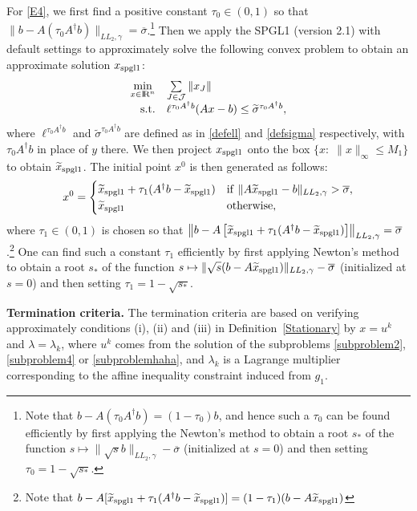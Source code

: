 \documentclass[10pt]{article}
\numberwithin{equation}{section}
\def\R{{\rm I\!R}}
\begin{document}
For \eqref{E4}, we first find a positive constant $\tau_0\in(0, 1)$ so that $\|b - A(\tau_0 A^\dagger b)\|_{LL_2,\gamma} = \overline\sigma$.\footnote{Note that $b - A(\tau_0 A^\dagger b) = (1 - \tau_0)b$, and hence such a $\tau_0$ can be found efficiently by first applying the Newton's method to obtain a root $s_*$ of the function $s\mapsto \|\sqrt{s}b\|_{LL_2,\gamma} - \overline\sigma$ (initialized at $s = 0$) and then setting $\tau_0 = 1 - \sqrt{s_*}$.}
Then we apply the SPGL1 \cite{BeFr09} (version 2.1) with default settings to approximately solve the following convex problem to obtain an approximate solution $x_{\rm spgl1}$:
\begin{equation}\label{SPGL1nonconvexL1}
\begin{array}{rl}
  \min\limits_{x\in \R^n} & \sum\limits_{J\in\mathcal{J}}\|x_J\| \\
  {\rm s.t.} & \ell^{\tau_0A^\dagger b}(Ax - b)\le \widetilde\sigma^{\tau_0A^\dagger b},
\end{array}
\end{equation}
where $\ell^{\tau_0A^\dagger b}$ and $\widetilde\sigma^{\tau_0A^\dagger b}$ are defined as in \eqref{defell} and \eqref{defsigma} respectively, with $\tau_0A^\dagger b$ in place of $y$ there. We then project $x_{\rm spgl1}$ onto the box $\{x:\; \|x\|_\infty\le M_1\}$ to obtain $\widetilde x_{\rm spgl1}$. The initial point $x^0$ is then generated as follows:
\begin{equation}\label{initial2}
x^0 = \begin{cases}
  \widetilde x_{\rm spgl1} + \tau_1(A^\dagger b - \widetilde x_{\rm spgl1}) & {\rm if}\ \|A\widetilde x_{\rm spgl1} - b\|_{LL_2,\gamma} > \overline\sigma,\\
  \widetilde x_{\rm spgl1} & {\rm otherwise},
\end{cases}
\end{equation}
where $\tau_1\in (0, 1)$ is chosen so that $\left\|b - A\left[\widetilde x_{\rm spgl1} + \tau_1(A^\dagger b - \widetilde x_{\rm spgl1})\right]\right\|_{LL_2,\gamma} = \overline\sigma$.\footnote{Note that $b - A[\widetilde x_{\rm spgl1} + \tau_1(A^\dagger b - \widetilde x_{\rm spgl1})] = (1 - \tau_1)(b-A \widetilde x_{\rm spgl1})$} One can find such a constant $\tau_1$ efficiently by first applying Newton's method to obtain a root $s_*$ of the function $s\mapsto \|\sqrt{s}(b - A\widetilde x_{\rm spgl1})\|_{LL_2,\gamma} - \overline\sigma$ (initialized at $s = 0$) and then setting $\tau_1 = 1 - \sqrt{s_*}$.

\textbf{Termination criteria.} The termination criteria are based on verifying approximately conditions (i), (ii) and (iii) in Definition~\ref{Stationary} by $x = u^k$ and $\lambda = \lambda_k$, where $u^k$ comes from the solution of the subproblems \eqref{subproblem2}, \eqref{subproblem4} or \eqref{subproblemhaha}, and $\lambda_k$ is a Lagrange multiplier corresponding to the affine inequality constraint induced from $g_1$.
\end{document}
